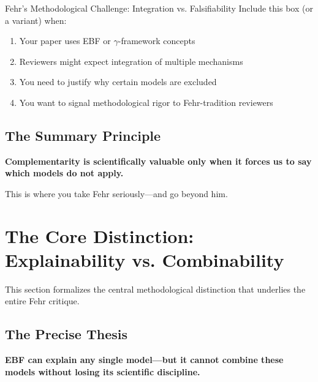 \begin{chapter}{Fehr's Methodological Challenge: Integration vs. Falsifiability}
Include this box (or a variant) when:
\begin{enumerate}
    \item Your paper uses EBF or $\gamma$-framework concepts
    \item Reviewers might expect integration of multiple mechanisms
    \item You need to justify why certain models are excluded
    \item You want to signal methodological rigor to Fehr-tradition reviewers
\end{enumerate}

\subsection{The Summary Principle}

\begin{tcolorbox}[colback=blue!5!white,colframe=blue!75!black]
\begin{center}
\large
\textbf{Complementarity is scientifically valuable only when it forces us to say which models do not apply.}
\end{center}
\end{tcolorbox}

This is where you take Fehr seriously---and go beyond him.


\section{The Core Distinction: Explainability vs. Combinability}
\label{sec:explainability-combinability}

This section formalizes the central methodological distinction that underlies
the entire Fehr critique.

\subsection{The Precise Thesis}

\begin{tcolorbox}[colback=red!5!white,colframe=red!75!black,title=\textbf{Central Claim}]
\begin{center}
\large
\textbf{EBF can explain any single model---but it cannot combine these models without losing its scientific discipline.}
\end{center}


\end{tcolorbox}
\end{chapter}
